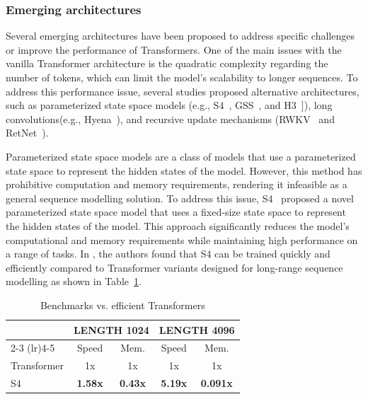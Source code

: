 \subsubsection{Emerging architectures}
\label{subsec:emerging-architectures}

Several emerging architectures have been proposed to address specific challenges or improve the performance of Transformers.
One of the main issues with the vanilla Transformer architecture is the quadratic complexity regarding the number of tokens, which can limit the model's scalability to longer sequences.
To address this performance issue, several studies proposed alternative architectures, such as parameterized state space models (e.g., S4~\cite{gu2022efficiently}, GSS~\cite{mehta2022long}, and H3~\cite{dao2022hungry}]), long convolutions(e.g., Hyena~\cite{poli2023hyena}), and recursive update mechanisms (RWKV~\cite{peng2023rwkv} and RetNet~\cite{sun2023retentive}).

Parameterized state space models are a class of models that use a parameterized state space to represent the hidden states of the model.
However, this method has prohibitive computation and memory requirements, rendering it infeasible as a general sequence modelling solution.
To address this issue, S4~\cite{gu2022efficiently} proposed a novel parameterized state space model that uses a fixed-size state space to represent the hidden states of the model.
This approach significantly reduces the model's computational and memory requirements while maintaining high performance on a range of tasks.
In \textcite{gu2022efficiently}, the authors found that S4 can be trained quickly and efficiently compared to Transformer variants designed for long-range sequence modelling as shown in Table~\ref{tab:ssm_efficiency}.

\begin{table}[htbp]
	\centering
	\begin{tabularx}{0.6\textwidth}{Xcccc}
		\toprule
		            & \multicolumn{2}{c}{LENGTH 1024} & \multicolumn{2}{c}{LENGTH 4096}                                    \\
		\cmidrule(lr){2-3} \cmidrule(lr){4-5}
		            & Speed                           & Mem.                            & Speed          & Mem.            \\
		\midrule
		Transformer & 1x                              & 1x                              & 1x             & 1x              \\
		S4          & \textbf{1.58x}                  & \textbf{0.43x}                  & \textbf{5.19x} & \textbf{0.091x} \\
		\bottomrule
	\end{tabularx}
	\caption{Benchmarks vs. efficient Transformers}
	\label{tab:ssm_efficiency}
\end{table}

